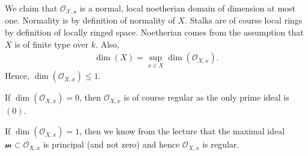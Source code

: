 \newcommand{\sheet}{11}




\maketitle{}

\begin{exercise}{1}
    We claim that $\mathcal{O_{X,x}}$ is a normal, local noetherian domain of dimension at most one. 
    Normality is by definition of normality of $X$. Stalks are of course local rings by definition of locally ringed space.
    Noetherian comes from the assumption that $X$ is of finite type over $k$. Also, 
    \begin{align*}
        \dim(X)=\sup_{x\in X}\dim(\mathcal{O}_{X,x}).
    \end{align*}
    Hence, $\dim(\mathcal{O}_{X,x})\le 1$.

    If $\dim(\mathcal{O}_{X,x})= 0$, then $\mathcal{O}_{X,x}$ is of course regular as the only prime ideal is $(0)$.

    If $\dim(\mathcal{O}_{X,x})= 1$, then we know from the lecture that the maximal ideal $\mathcal{m}\subset \mathcal{O}_{X,x}$
    is principal (and not zero) and hence $\mathcal{O}_{X,x}$ is regular.
\end{exercise}


